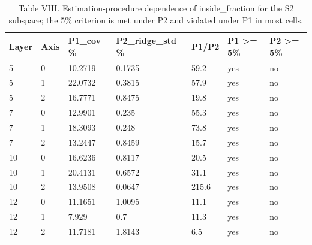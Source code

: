 \begin{table}[t]
\centering
\caption{Table VIII. Estimation-procedure dependence of inside\_fraction for the S2 subspace; the 5\% criterion is met under P2 and violated under P1 in most cells.}
\label{tab:viii}
\begin{tabular}{lllllll}
\toprule
Layer & Axis & P1\_cov \% & P2\_ridge\_std \% & P1/P2 & P1 >= 5\% & P2 >= 5\% \\
\midrule
5 & 0 & 10.2719 & 0.1735 & 59.2 & yes & no \\
5 & 1 & 22.0732 & 0.3815 & 57.9 & yes & no \\
5 & 2 & 16.7771 & 0.8475 & 19.8 & yes & no \\
7 & 0 & 12.9901 & 0.235 & 55.3 & yes & no \\
7 & 1 & 18.3093 & 0.248 & 73.8 & yes & no \\
7 & 2 & 13.2447 & 0.8459 & 15.7 & yes & no \\
10 & 0 & 16.6236 & 0.8117 & 20.5 & yes & no \\
10 & 1 & 20.4131 & 0.6572 & 31.1 & yes & no \\
10 & 2 & 13.9508 & 0.0647 & 215.6 & yes & no \\
12 & 0 & 11.1651 & 1.0095 & 11.1 & yes & no \\
12 & 1 & 7.929 & 0.7 & 11.3 & yes & no \\
12 & 2 & 11.7181 & 1.8143 & 6.5 & yes & no \\
\bottomrule
\end{tabular}
\end{table}